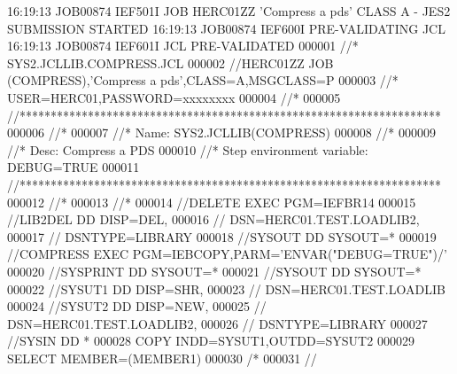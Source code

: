 \documentclass[
11pt,
a4paper,
oneside
]{scrbook}
\begin{document}
{\begin{Printout}[
	form=ibm1403,
	paperheight=60,
	bandlines=3,
	feedlines=3,
	fitcolumns=132,
	linenumbers=true,
	punchholes=true,
	fontsize=\scriptsize
	]
16:19:13 JOB00874 IEF501I JOB HERC01ZZ 'Compress a pds' CLASS A - JES2 SUBMISSION STARTED
16:19:13 JOB00874 IEF600I PRE-VALIDATING JCL
16:19:13 JOB00874 IEF601I JCL PRE-VALIDATED
000001 //* SYS2.JCLLIB.COMPRESS.JCL
000002 //HERC01ZZ JOB (COMPRESS),'Compress a pds',CLASS=A,MSGCLASS=P           
000003 //* USER=HERC01,PASSWORD=xxxxxxxx                                       
000004 //*                                                                     
000005 //********************************************************************  
000006 //*                                                                     
000007 //*  Name: SYS2.JCLLIB(COMPRESS)                                        
000008 //*                                                                     
000009 //*  Desc: Compress a PDS                                               
000010 //*  Step environment variable: DEBUG=TRUE                              
000011 //********************************************************************  
000012 //*                                                                     
000013 //*                                                                     
000014 //DELETE   EXEC PGM=IEFBR14                                             
000015 //LIB2DEL  DD   DISP=DEL,                                               
000016 //              DSN=HERC01.TEST.LOADLIB2,                               
000017 //              DSNTYPE=LIBRARY                                         
000018 //SYSOUT   DD   SYSOUT=*                                                
000019 //COMPRESS EXEC PGM=IEBCOPY,PARM='ENVAR("DEBUG=TRUE")/'                 
000020 //SYSPRINT DD   SYSOUT=*                                                
000021 //SYSOUT   DD   SYSOUT=*                                                
000022 //SYSUT1   DD   DISP=SHR,                                               
000023 //              DSN=HERC01.TEST.LOADLIB                                 
000024 //SYSUT2   DD   DISP=NEW,                                               
000025 //              DSN=HERC01.TEST.LOADLIB2,                               
000026 //              DSNTYPE=LIBRARY                                         
000027 //SYSIN    DD   *                                                       
000028 COPY INDD=SYSUT1,OUTDD=SYSUT2                                           
000029 SELECT MEMBER=(MEMBER1)                                                 
000030 /*                                                                      
000031 //                                                                      

\end{Printout}}
\end{document}
